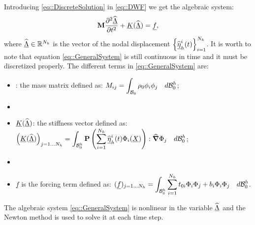 Introducing \eqref{eq::DiscreteSolution} in \eqref{eq::DWF} we get the algebraic system:
\begin{equation}
  \textbf{M}\frac{\partial^2\widehat{\underline{\Lambda}}}{\partial t^2}+\underline{K}(\widehat{\underline{\Lambda}}) = \underline{f},
  \label{eq::GeneralSystem}
\end{equation}
where $\widehat{\underline{\Lambda}} \in \mathbb{R}^{N_h}$ is the vector of the nodal displacement $\left\{\widehat{\underline{\eta}}_h^i(t)\right\}_{i=1}^{N_h}$. It is worth to note that equation \eqref{eq::GeneralSystem} is still continuous in time and it must be discretized properly. The different terms in \eqref{eq::GeneralSystem} are:
\begin{itemize}
  \item \mass: the mass matrix defined as: $\displaystyle M_{ij}=\int_{\mathcal{B}_0}\rho_0\phi_i\phi_j\quad d\mathcal{B}_0^h$;
  \item[]
  \item $\underline{K}(\widehat{\underline{\Lambda}})$: the stiffness vector defined as: $\displaystyle \left(\underline{K}(\widehat{\underline{\Lambda}})\right)_{j=1\ldots N_h}=\int_{\mathcal{B}_0^h}\textbf{P}\left(\sum_{i=1}^{N_h}\widehat{\underline{\eta}}_h^i(t)\Phi_i(\underline{X})\right):\widehat{\boldsymbol{\nabla}}\Phi_j\quad d \mathcal{B}_0^h$;
  \item[]
  \item $\underline{f}$ is the forcing term defined as: $\displaystyle (\underline{f})_{j=1\ldots N_h}=\int_{\mathcal{B}_0^h}\sum_{i=1}^{N_h}t_{0i}\Phi_i\Phi_j+b_i\Phi_i\Phi_j\quad d\mathcal{B}_0^h$.
\end{itemize}
The algebraic system \eqref{eq::GeneralSystem} is nonlinear in the variable $\widehat{\underline{\Lambda}}$ and the Newton method is used to solve it at each time step.

